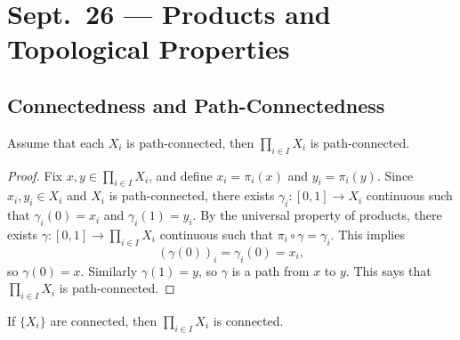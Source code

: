 \chapter{Sept.~26 --- Products and Topological Properties}

\section{Connectedness and Path-Connectedness}
\begin{theorem}
  Assume that each $X_i$ is path-connected, then
  $\prod_{i \in I} X_i$ is path-connected.
\end{theorem}

\begin{proof}
  Fix $x, y \in \prod_{i \in I} X_i$, and define
  $x_i = \pi_i(x)$ and $y_i = \pi_i(y)$.
  Since $x_i, y_i \in X_i$ and $X_i$ is
  path-connected, there exists
  $\gamma_i : [0, 1] \to X_i$ continuous
  such that $\gamma_i(0) = x_i$ and
  $\gamma_i(1) = y_i$. By the universal
  property of products, there exists
  $\gamma : [0, 1] \to \prod_{i \in I} X_i$
  continuous such that $\pi_i \circ \gamma = \gamma_i$.
  This implies
  \[
    (\gamma(0))_i = \gamma_i(0) = x_i,
  \]
  so $\gamma(0) = x$. Similarly
  $\gamma(1) = y$, so $\gamma$ is a path
  from $x$ to $y$. This says that
  $\prod_{i \in I} X_i$ is path-connected.
\end{proof}

\begin{theorem}
  If $\{X_i\}$ are connected, then
  $\prod_{i \in I} X_i$ is connected.
\end{theorem}

